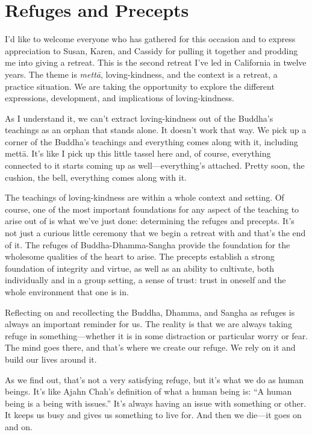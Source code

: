 \chapter{Refuges and Precepts}

I’d like to welcome everyone who has gathered for this occasion and to
express appreciation to Susan, Karen, and Cassidy for pulling it
together and prodding me into giving a retreat. This is the second
retreat I’ve led in California in twelve years. The theme is
\emph{mettā}, loving-kindness, and the context is a retreat, a practice
situation. We are taking the opportunity to explore the different
expressions, development, and implications of loving-kindness.

As I understand it, we can’t extract loving-kindness out of the Buddha’s
teachings as an orphan that stands alone. It doesn’t work that way. We
pick up a corner of the Buddha’s teachings and everything comes along
with it, including mettā. It’s like I pick up this little tassel here
and, of course, everything connected to it starts coming up as
well—everything’s attached. Pretty soon, the cushion, the bell,
everything comes along with it.

The teachings of loving-kindness are within a whole context and setting.
Of course, one of the most important foundations for any aspect of the
teaching to arise out of is what we’ve just done: determining the
refuges and precepts. It’s not just a curious little ceremony that we
begin a retreat with and that’s the end of it. The refuges of
Buddha-Dhamma-Sangha provide the foundation for the wholesome qualities
of the heart to arise. The precepts establish a strong foundation of
integrity and virtue, as well as an ability to cultivate, both
individually and in a group setting, a sense of trust: trust in oneself
and the whole environment that one is in.

Reflecting on and recollecting the Buddha, Dhamma, and Sangha as refuges
is always an important reminder for us. The reality is that we are
always taking refuge in something—whether it is in some distraction or
particular worry or fear. The mind goes there, and that’s where we
create our refuge. We rely on it and build our lives around it.

As we find out, that’s not a very satisfying refuge, but it’s what we do
as human beings. It’s like Ajahn Chah’s definition of what a human being
is: “A human being is a being with issues.” It’s always having an issue
with something or other. It keeps us busy and gives us something to live
for. And then we die—it goes on and on.


